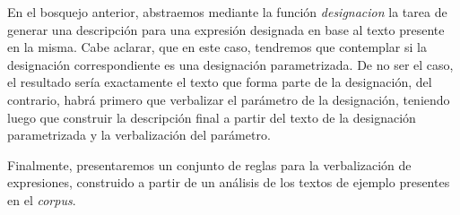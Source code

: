 En el bosquejo anterior, abstraemos mediante la función \emph{designacion} la tarea de generar una descripción para una expresión designada en base al texto presente en la misma. Cabe aclarar, que en este caso, tendremos que contemplar si la designación correspondiente es una designación parametrizada. De no ser el caso, el resultado sería exactamente el texto que forma parte de la designación, del contrario, habrá primero que verbalizar el parámetro de la designación, teniendo luego que construir la descripción final a partir del texto de la designación parametrizada y la verbalización del parámetro.

Finalmente, presentaremos un conjunto de reglas para la verbalización de expresiones, construido a partir de un análisis de los textos de ejemplo presentes en el \emph{corpus}.

